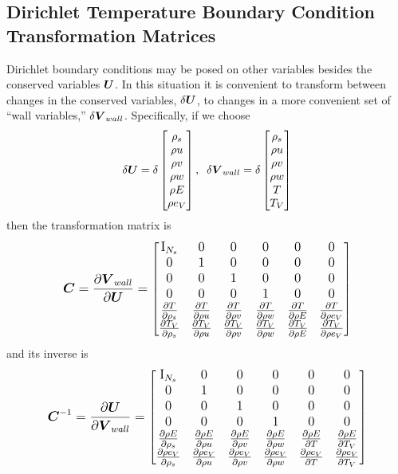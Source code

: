 \subsection{Dirichlet Temperature Boundary Condition Transformation Matrices}
Dirichlet boundary conditions may be posed on other variables besides the conserved variables ${\boldsymbol{U}}$.  In this situation it is convenient to transform between changes in the conserved variables, $\delta{\boldsymbol{U}}$, to changes in a more convenient set of ``wall variables,'' $\delta{\boldsymbol{V}}_{wall}$.  Specifically, if we choose
\begin{gather*}
    \delta{\boldsymbol{U}} = \delta
    \begin{bmatrix}
      \rho_s \\
      \rho u \\
      \rho v \\
      \rho w \\
      \rho E \\
      \rho  e_V 
    \end{bmatrix},\;\;
    \delta{\boldsymbol{V}}_{wall} = \delta
    \begin{bmatrix}
      \rho_s \\
      \rho u \\
      \rho v \\
      \rho w \\
      T \\
      T_V 
    \end{bmatrix}
\end{gather*}
then the transformation matrix is
\begin{equation}
  \large
  {\boldsymbol{C}}={\frac{\partial{{\boldsymbol{V}}_{wall}}}{\partial{{\boldsymbol{U}}}}} =
  \begin{bmatrix}
    {\boldsymbol{\text{I}}}_{N_s} & 0 & 0 & 0 & 0 & 0 \\
    0 & 1 & 0 & 0 & 0 & 0 \\
    0 & 0 & 1 & 0 & 0 & 0 \\
    0 & 0 & 0 & 1 & 0 & 0 \\
    {\frac{\partial{T}}{\partial{\rho_s}}}   &  {\frac{\partial{T}}{\partial{\rho u}}}   &  {\frac{\partial{T}}{\partial{\rho v}}}   &  {\frac{\partial{T}}{\partial{\rho w}}}  & {\frac{\partial{T}}{\partial{\rho E}}}   & {\frac{\partial{T}}{\partial{\rho e_V}}} \\
    {\frac{\partial{T_V}}{\partial{\rho_s}}} &  {\frac{\partial{T_V}}{\partial{\rho u}}} &  {\frac{\partial{T_V}}{\partial{\rho v}}} &  {\frac{\partial{T_V}}{\partial{\rho w}}} & {\frac{\partial{T_V}}{\partial{\rho E}}} & {\frac{\partial{T_V}}{\partial{\rho e_V}}}
  \end{bmatrix}
\end{equation}
and its inverse is 
\begin{equation}
  \large
  {\boldsymbol{C}}^{-1}={\frac{\partial{{\boldsymbol{U}}}}{\partial{{\boldsymbol{V}}_{wall}}}} =
  \begin{bmatrix}
    {\boldsymbol{\text{I}}}_{N_s} & 0 & 0 & 0 & 0 & 0 \\
    0 & 1 & 0 & 0 & 0 & 0 \\
    0 & 0 & 1 & 0 & 0 & 0 \\
    0 & 0 & 0 & 1 & 0 & 0 \\
    {\frac{\partial{\rho E}}{\partial{\rho_s}}}   &  {\frac{\partial{\rho E}}{\partial{\rho u}}}   &  {\frac{\partial{\rho E}}{\partial{\rho v}}}   &  {\frac{\partial{\rho E}}{\partial{\rho w}}}  & {\frac{\partial{\rho E}}{\partial{T}}}   & {\frac{\partial{\rho E}}{\partial{T_V}}} \\
    {\frac{\partial{\rho e_V}}{\partial{\rho_s}}} &  {\frac{\partial{\rho e_V}}{\partial{\rho u}}} &  {\frac{\partial{\rho e_V}}{\partial{\rho v}}} &  {\frac{\partial{\rho e_V}}{\partial{\rho w}}} & {\frac{\partial{\rho e_V}}{\partial{T}}} & {\frac{\partial{\rho e_V}}{\partial{T_V}}}
  \end{bmatrix}
\end{equation}
